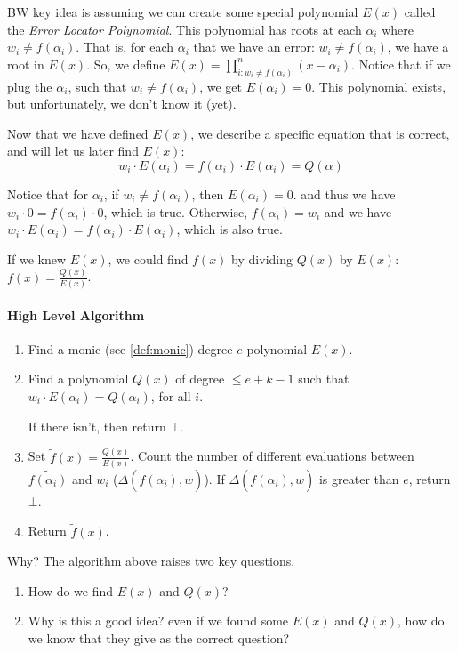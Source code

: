 BW key idea is assuming we can create some special polynomial $E(x)$ called
the \emph{Error Locator Polynomial}. 
This polynomial has roots at each $\alpha_i$ where $w_i\ne f(\alpha_i)$. That is, 
for each $\alpha_i$  that we have an error: $w_i\ne f(\alpha_i)$, we have a root in $E(x)$.
So, we define $ E(x) = \prod_{i:w_i\ne f(\alpha_i)}^{n} (x-\alpha_i)$.
Notice that if we plug the $\alpha_i$, such that $w_i\ne f(\alpha_i)$,
 we get $E(\alpha_i)=0$.
This polynomial exists, but unfortunately, we don't know it (yet). 

Now that we have defined $E(x)$, we describe a specific 
equation that is correct, and will let us later find $E(x)$:
$$ w_i\cdot E(\alpha_i) = f(\alpha_i)\cdot E(\alpha_i)= Q(\alpha)$$


\begin{insight}
    Notice that for $\alpha_i$, if $w_i\ne f(\alpha_i)$, then $E(\alpha_i)=0$.
    and thus we have $w_i\cdot 0 = f(\alpha_i)\cdot 0$, which is true.
    Otherwise, $f(\alpha_i)=w_i$ and we have
     $w_i\cdot E(\alpha_i) = f(\alpha_i)\cdot E(\alpha_i)$, which is also true.
\end{insight}

If we knew $E(x)$, we could find $f(x)$ by dividing $Q(x)$ by $E(x)$:
$f(x)=\frac{Q(x)}{E(x)}$.

\paragraph{High Level Algorithm}
\begin{enumerate}
    \item Find a monic (see \autoref{def:monic}) degree $e$ polynomial $E(x)$.
    \item Find a polynomial $Q(x)$ of degree $\le e+k-1$ such 
    that $w_i\cdot E(\alpha_i)=Q(\alpha_i)$, for all $i$.

    If there isn't, then return $\bot$.
    \item Set $\tilde{f}(x)=\frac{Q(x)}{E(x)}$. Count the number of different 
    evaluations between $\tilde{f(\alpha_i)}$ and $w_i$ ($\Delta(\tilde{f}(\alpha_i),w)$).  
    If  $\Delta(\tilde{f}(\alpha_i),w)$ is greater than $e$, return $\bot$.
    \item Return $\tilde{f}(x)$.
\end{enumerate}


\begin{notice}{Why?}
    The algorithm above raises two key questions.
    \begin{enumerate}
        \item How do we find $E(x)$ and $Q(x)$?
        \item Why is this a good idea? even if we found some $E(x)$ and $Q(x)$, 
        how do we know that they give as the correct question?
    \end{enumerate}    
\end{notice}



